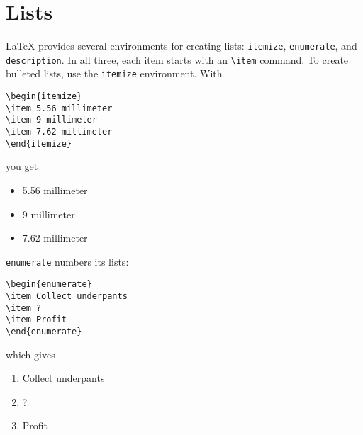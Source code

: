 \section{Lists}

\LaTeX{} provides several environments for creating lists:
\texttt{itemize}, \texttt{enumerate}, and \texttt{description}.
In all three, each item starts with an \verb|\item| command.
To create bulleted lists, use the \texttt{itemize} environment.
With
\begin{leftfigure}
\begin{lstlisting}
\begin{itemize}
\item 5.56 millimeter
\item 9 millimeter
\item 7.62 millimeter
\end{itemize}
\end{lstlisting}
\end{leftfigure}
you get
\begin{leftfigure}
\lm%
\begin{itemize}[leftmargin=*]
\item 5.56 millimeter
\item 9 millimeter
\item 7.62 millimeter
\end{itemize}
\end{leftfigure}

\bigskip
\noindent \texttt{enumerate} numbers its lists:
\begin{leftfigure}
\begin{lstlisting}
\begin{enumerate}
\item Collect underpants
\item ?
\item Profit
\end{enumerate}
\end{lstlisting}
\end{leftfigure}
which gives
\begin{leftfigure}
\lm%
\begin{enumerate}[leftmargin=*]
\item Collect underpants
\item ?
\item Profit
\end{enumerate}
\end{leftfigure}

